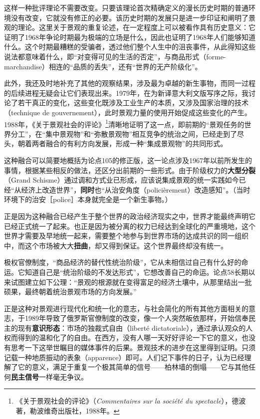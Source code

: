 \documentclass[fontset=fandol, a4paper, 12pt, openright]{ctexbook}
\begin{document}
这样一种批评理论不需要改变。只要该理论首次精确定义的漫长历史时期的普通环境没有改变，它就没有修正的必要。该历史时期的发展只是进一步印证和阐明了景观的理论。这里关于景观的重复论述，在一定程度上可以被看作具有历史意义：它证明了1968年争论时期最为极端的立场是什么，因此也证明了1968年人们能够知道什么。这个时期最糟糕的受骗者，透过他们整个人生中的沮丧事件，从此得知这些说法都意味着什么，即“对变得可见的生活的否定”，与商品形式（forme-marchandise）相连的“品质的丢失”，还有“世界的无产阶级化”。

此外，我还及时地补充了其他的观察结果，涉及最为卓越的新生事物，而同一过程的后续进程无疑会让它们表现出来。1979年，在为新译意大利文版写序之际，我讨论了若干真正的变化，这些变化既涉及工业生产的本质，又涉及国家治理的技术（technique de gouvernement），此时景观力量的使用开始促成这些变化的产生。1988年，《关于景观社会的评论》\footnote{《关于景观社会的评论》（\textit{Commentaires sur la société du spectacle}），德波著，勒波维奇出版社，1988年。}清晰地证明了这一点，即前期的“景观任务的世界分工”，在“集中景观物”和“弥散景观物”相互竞争的统治之间，已经走到了尽头，朝着两者融合的有利方向发展，形成一种“集成景观物”的共同形式。

这种融合可以简要地概括为论点105的修正版，这一论点涉及1967年以前所发生的事情，根据某些相反的做法，还区分出前期的一些形式。由于阶级权力的\textbf{大型分裂}（Grand Schisme）通过调和方式业已形成，应该说集成景观的统一实践如今已经“从经济上改造世界”，\textbf{同时}也“从治安角度（policièrement）改造感知”。（当时环境下的治安［police］本身就完全是一个新生事物。）

正是因为这种融合已经产生于整个世界的政治经济现实之中，世界才能最终声明它已经正式统一了起来。也正是因为被分离的权力已经达到全球化的严重境地，这个世界才需要及早地统一起来，需要整个地参与到世界市场的达成共识的同一组织中，而这个市场被大大\textbf{扭曲}，却又得到保证。这个世界最终却没有统一。

极权官僚制度，“商品经济的替代性统治阶级”，它从未相信过自己有什么好的命运。它知道自己是“统治阶级的不发达形式”，它想改善自己的命运。论点58长期以来试图建立如下公理：“景观的根源就在变得富足的经济土壤中，从那里结出一批硕果，最终朝着统治景观市场的方向发展。”

正是这种对景观进行现代化和统一化的意志，与社会简化的所有其他方面相关的意志，于1989年导致了俄罗斯官僚制度的改变，像一个人突然皈依那样，开始信奉民主的现有\textbf{意识形态}：市场的独裁式自由（liberté dictatoriale），通过承认观众的人权而得到的温和化了的自由。在西方，没有人哪一天好好评论一下它的意义，也没有思考一下这举世瞩目的媒体事件的后果。景观技术的进步在这里得到证明。只须记载一种地质振动的表象（apparence）即可。人们记下事件的日子，认为已经理解了它的意义，满足于重复一个极其简单的信号——柏林墙的倒塌——它与其他任何\textbf{民主信号}一样毫无争议。
\end{document}
